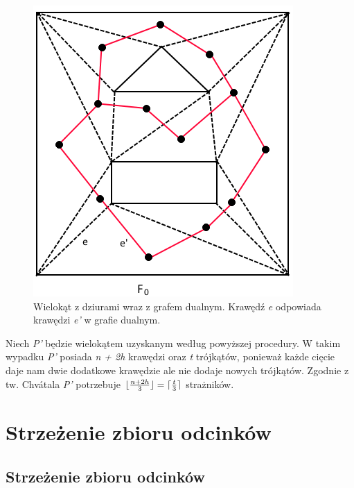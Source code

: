 \documentclass[brudnopis]{xmgr}
\DeclarePairedDelimiter\ceil{\lceil}{\rceil}
\DeclarePairedDelimiter\floor{\lfloor}{\rfloor}
\begin{document}
\begin{figure}[h!]
  \centering
    \includegraphics{rysunki/triangulacja_dziury.png}
    \caption{Wielokąt z dziurami wraz z grafem dualnym. Krawędź \textit{e} odpowiada krawędzi \textit{e'} w grafie dualnym.}
    \vspace{3in}
\end{figure} 

\indent Niech \textit{P'} będzie wielokątem uzyskanym według powyższej procedury. W takim wypadku \textit{P'} posiada \textit{n + 2h} krawędzi oraz \textit{t} trójkątów, ponieważ każde cięcie daje nam dwie dodatkowe krawędzie ale nie dodaje nowych trójkątów. Zgodnie z tw. Chv\'atala \textit{P'} potrzebuje $\floor{\frac{n+2h}{3}} = \ceil{\frac{t}{3}}$ strażników.

\chapter{Strzeżenie zbioru odcinków}
\section{Strzeżenie zbioru odcinków}
\end{document}
